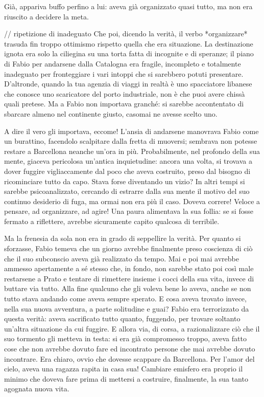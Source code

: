 Già, appariva buffo perfino a lui: aveva già organizzato quasi tutto, ma non era riuscito a decidere la meta.

// ripetizione di inadeguato
Che poi, dicendo la verità, il verbo *organizzare* trasuda fin troppo ottimismo rispetto quella che era situazione. La destinazione ignota era solo la ciliegina su una torta fatta di incognite e di speranze; il piano di Fabio per andarsene dalla Catalogna era fragile, incompleto e totalmente inadeguato per fronteggiare i vari intoppi che si sarebbero potuti presentare. D'altronde, quando la tua agenzia di viaggi in realtà è uno spacciatore libanese che conosce uno scaricatore del porto industriale, non è che puoi avere chissà quali pretese. Ma a Fabio non importava granché: si sarebbe accontentato di sbarcare almeno nel continente giusto, casomai ne avesse scelto uno.

A dire il vero gli importava, eccome! L'ansia di andarsene manovrava Fabio come un burattino, facendolo scalpitare dalla fretta di muoversi; sembrava non potesse restare a Barcellona neanche un'ora in più. Probabilmente, nel profondo della sua mente, giaceva pericolosa un'antica inquietudine: ancora una volta, si trovava a dover fuggire vigliaccamente dal poco che aveva costruito, preso dal bisogno di ricominciare tutto da capo. Stava forse diventando un vizio? In altri tempi si sarebbe psicoanalizzato, cercando di estrarre dalla sua mente il motivo del suo continuo desiderio di fuga, ma ormai non era più il caso. Doveva correre! Veloce a pensare, ad organizzare, ad agire! Una paura alimentava la sua follia: se si fosse fermato a riflettere, avrebbe sicuramente capito qualcosa di terribile.

Ma la frenesia da sola non era in grado di seppellire la verità. Per quanto si sforzasse, Fabio temeva che un giorno avrebbe finalmente preso coscienza di ciò che il suo subconscio aveva già realizzato da tempo. Mai e poi mai avrebbe ammesso apertamente a sé stesso che, in fondo, non sarebbe stato poi così male restarsene a Prato e tentare di rimettere insieme i cocci della sua vita, invece di buttare via tutto. Alla fine qualcuno che gli voleva bene lo aveva, anche se non tutto stava andando come aveva sempre sperato. E cosa aveva trovato invece, nella sua nuova avventura, a parte solitudine e guai? Fabio era terrorizzato da questa verità: aveva sacrificato tutto quanto, fuggendo, per trovare soltanto un'altra situazione da cui fuggire. E allora via, di corsa, a razionalizzare ciò che il suo tormento gli metteva in testa: si era già compromesso troppo, aveva fatto cose che non avrebbe dovuto fare ed incontrato persone che mai avrebbe dovuto incontrare. Era chiaro, ovvio che dovesse scappare da Barcellona. Per l'amor del cielo, aveva una ragazza rapita in casa sua! Cambiare emisfero era proprio il minimo che doveva fare prima di mettersi a costruire, finalmente, la sua tanto agognata nuova vita.

